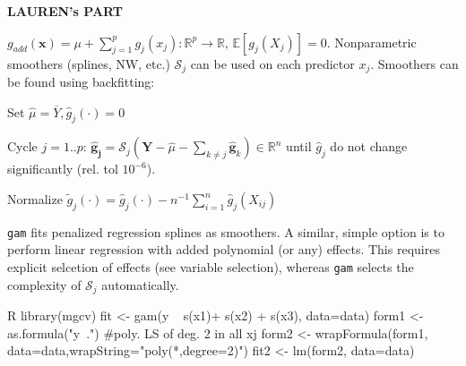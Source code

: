 \textbf{LAUREN's PART}
\begin{sectionbox}
$g_{add}(\mathbf{x}) = \mu + \sum_{j=1}^{p} g_j(x_j) : \mathbb{R}^p \rightarrow \mathbb{R}$, $\mathbb{E}[g_j(X_j)] = 0$. Nonparametric smoothers (splines, NW, etc.) $\mathcal{S}_j$ can be used on each predictor $x_j$. Smoothers can be found using backfitting:
\begin{enumeratenosep}[label=\roman*]
\item Set $\hat{\mu} = \overline{Y}, \hat{g}_j(\cdot) = 0$
\item Cycle $j=1..p$: $\mathbf{\hat{g}_j} = \boldsymbol{\mathcal{S}}_j(\mathbf{Y}- \hat{\mu} -\sum_{k\neq j}\mathbf{\hat{g}}_k) \in \mathbb{R}^n $ until $\hat{g}_j$ do not change significantly (rel. tol $10^{-6}$).
\item Normalize $\tilde{g}_j(\cdot) = \hat{g}_j(\cdot) - n^{-1}\sum_{i=1}^{n}\hat{g}_j(X_{ij})$	
\end{enumeratenosep}
\texttt{gam} fits penalized regression splines as smoothers. A similar, simple option is to perform linear regression with added polynomial (or any) effects. This requires explicit selcetion of effects (see variable selection), whereas \texttt{gam} selects the complexity of $\mathcal{S}_j$ automatically.
\begin{mintlinebox}{R}
library(mgcv)
fit <- gam(y ~ s(x1)+ s(x2) + s(x3), data=data)
form1 <- as.formula("y~.") #poly. LS of deg. 2 in all xj
form2 <- wrapFormula(form1,
	data=data,wrapString="poly(*,degree=2)")
fit2 <- lm(form2, data=data)
\end{mintlinebox}
\end{sectionbox}

